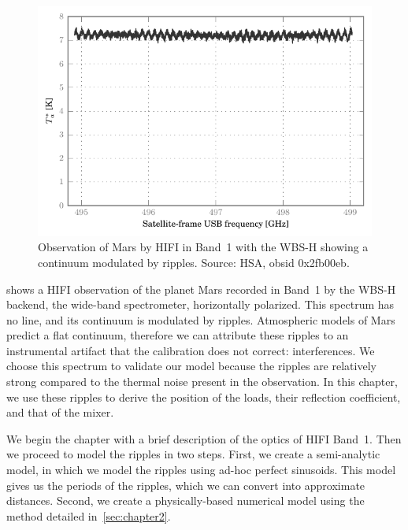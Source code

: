 \begin{figure}
    \centering
    \includegraphics{mars_25_original}
    \caption{Observation of Mars by HIFI in Band~1 with the WBS-H showing a continuum modulated by ripples.
    Source: HSA, obsid 0x2fb00eb.}
    \label{fig:mars_25_original}
\end{figure}

 shows a HIFI observation of the planet Mars recorded in Band~1 by the WBS-H backend, the wide-band spectrometer, horizontally polarized.
This spectrum has no line, and its continuum is modulated by ripples.
Atmospheric models of Mars predict a flat continuum, therefore we can attribute these ripples to an instrumental artifact that the calibration does not correct: interferences.
We choose this spectrum to validate our model because the ripples are relatively strong compared to the thermal noise present in the observation.
In this chapter, we use these ripples to derive the position of the loads, their reflection coefficient, and that of the mixer.

We begin the chapter with a brief description of the optics of HIFI Band~1.
Then we proceed to model the ripples in two steps.
First, we create a semi-analytic model, in which we model the ripples using ad-hoc perfect sinusoids.
This model gives us the periods of the ripples, which we can convert into approximate distances.
Second, we create a physically-based numerical model using the method detailed in~\cref{sec:chapter2}.


\FloatBarrier



